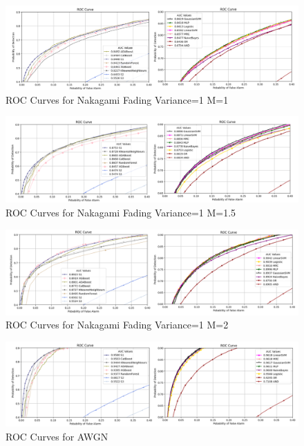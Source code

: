 \begin{figure}
  \begin{center}
  \includegraphics[width=1\textwidth]{figs/7.png}
  \end{center}
  \caption{ROC Curves for Nakagami Fading Variance=1 M=1}
\end{figure}

\begin{figure}
  \begin{center}
  \includegraphics[width=1\textwidth]{figs/8.png}
  \end{center}
  \caption{ROC Curves for Nakagami Fading Variance=1 M=1.5}
\end{figure}

\begin{figure}
  \begin{center}
  \includegraphics[width=1\textwidth]{figs/9.png}
  \end{center}
  \caption{ROC Curves for Nakagami Fading Variance=1 M=2}
\end{figure}

\begin{figure}
  \begin{center}
  \includegraphics[width=1\textwidth]{figs/10.png}
  \end{center}
  \caption{ROC Curves for AWGN}
\end{figure}

